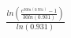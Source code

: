 \documentclass[preview]{standalone}
\begin{document}
\begin{align*}
\frac{ln(\frac{e^{30ln(0.931)}-1}{30ln(0.931)})}{ln(0.931)}
\end{align*}
\end{document}
